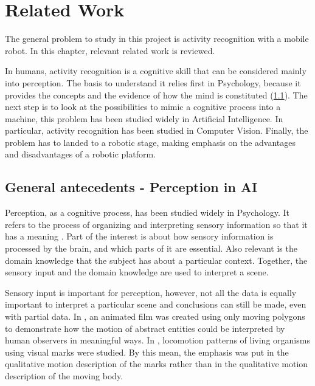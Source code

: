 \chapter{Related Work} \label{ch_relatedwork}

The general problem to study in this project is activity recognition with a mobile robot. 
In this chapter, relevant related work is reviewed.

In humans, activity recognition is a cognitive skill that can be considered mainly into perception. 
The basis to understand it relies first in Psychology, because it provides the concepts and the evidence of how the mind is constituted (\ref{ch_LitRev_Perception}). 
The next step is to look at the possibilities to mimic a cognitive process into a machine, this problem has been studied widely in Artificial Intelligence. %
In particular, activity recognition has been studied in Computer Vision. %
Finally, the problem has to landed to a robotic stage, making emphasis on the advantages and disadvantages of a robotic platform. %


\section{General antecedents - Perception in AI} \label{ch_LitRev_Perception}

Perception, as a cognitive process, has been studied widely in Psychology.
It refers to the process of organizing and interpreting sensory information so that it has a meaning \citep{King2014Psychology}.
Part of the interest is about how sensory information is processed by the brain, and which parts of it are essential.
Also relevant is the domain knowledge that the subject has about a particular context.
Together, the sensory input and the domain knowledge are used to interpret a scene.


Sensory input is important for perception, however, not all the data is equally important to interpret a particular scene and conclusions can still be made, even with partial data.
In \citep{Heider1944_Experimental}, an animated film was created using only moving polygons to demonstrate how the motion of abstract entities could be interpreted by human observers in meaningful ways.
In \citep{Johansson1973_VisualPer}, locomotion patterns of living organisms using visual marks were studied. 
By this mean, the emphasis was put in the qualitative motion description of the marks rather than in the qualitative motion description of the moving body.

